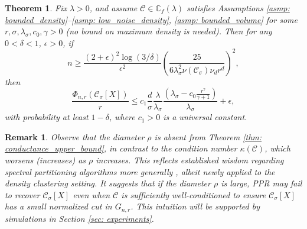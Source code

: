 \documentclass{article}
\newcommand{\1}{\mathbf{1}}
\newcommand{\Xbf}{X}             %
\newcommand{\Cbb}{\mathbb{C}}
\newcommand{\Cset}{\mathcal{C}}
\newcommand{\Csig}{\Cset_{\sigma}}
\theoremstyle{aldenthm}
\newtheorem{theorem}{Theorem}
\theoremstyle{aldenrmrk}
\newtheorem{remark}{Remark}
\begin{document}
\begin{theorem}
  \label{thm: conductance_upper_bound}
  Fix $\lambda > 0$, and assume $\Cset \in \Cbb_f(\lambda)$ satisfies
  Assumptions \ref{asmp: bounded_density}--\ref{asmp: low_noise_density}, 
  \ref{asmp: bounded_volume} for some $r, \sigma, \lambda_{\sigma}, c_0, \gamma
  > 0$ (no bound on maximum density is needed). Then for any $0 < \delta < 1$,
  $\epsilon > 0$, if 
  \begin{equation}
    \label{eqn: conductance_sample_complexity}
    n \geq \frac{(2+\epsilon)^2\log(3/\delta)}{\epsilon^2}\left(\frac{25}
      {6 \lambda_{\sigma}^2\nu(\Csig) \nu_d r^d}\right)^2,
  \end{equation}
  then
  \begin{equation}
    \label{eqn: conductance_additive_error_bound}
    \frac{\Phi_{n,r}(\Csig[\Xbf])}{r} \leq c_1 \frac{d}{\sigma}
    \frac{\lambda}{\lambda_{\sigma}} \frac{(\lambda_{\sigma} -
      c_0\frac{r^{\gamma}}{\gamma+1})}{\lambda_{\sigma}} + \epsilon, 
  \end{equation}
  with probability at least $1-\delta$, where $c_1 > 0$ is a universal constant. 
\end{theorem}

\begin{remark}
  \label{rmk: diameter}
  Observe that the diameter $\rho$ is absent from Theorem \ref{thm:
    conductance_upper_bound}, in contrast to the condition number
  $\kappa(\Cset)$, which worsens (increases) as $\rho$ increases. This
  reflects established wisdom regarding spectral partitioning
  algorithms more generally \citep{guattery1995, hein2010}, albeit newly applied
  to the density clustering setting. It suggests that if the diameter $\rho$ is
  large, PPR may fail to recover $\Csig[\Xbf]$ even when $\Cset$ is
  sufficiently well-conditioned to ensure $\Csig[\Xbf]$ has a small normalized
  cut in $G_{n,r}$. This intuition will be supported by simulations in Section
  \ref{sec: experiments}. 
\end{remark}
\end{document}
